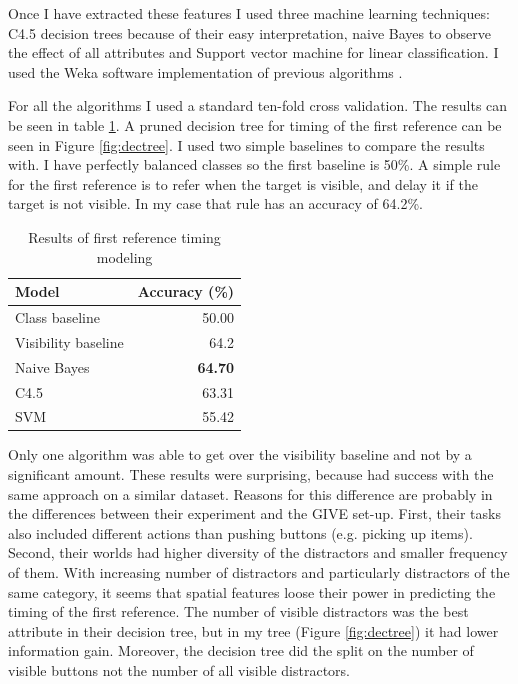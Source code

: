 Once I have extracted these features I used three machine learning techniques: C4.5 decision trees because of their easy interpretation, naive Bayes to observe the effect of all attributes and Support vector machine for linear classification. I used the Weka software implementation of previous algorithms \citep{hall2009weka}.

For all the algorithms I used a standard ten-fold cross validation. The results can be seen in table \ref{tab:firstref}. A pruned decision tree for timing of the first reference can be seen in Figure \ref{fig:dectree}. I used two simple baselines to compare the results with. I have perfectly balanced classes so the first baseline is 50\%. A simple rule for the first reference is to refer when the target is visible, and delay it if the target is not visible. In my case that rule has an accuracy of 64.2\%. 

\begin{table}[!htbp]
 \centering
\begin{tabular}{lr}
\toprule
Model    & Accuracy (\%)  \\
\midrule
Class baseline    & 50.00\\
Visibility baseline & 64.2\\
\midrule
Naive Bayes  & \textbf{64.70} \\
C4.5 & 63.31 \\
SVM & 55.42 \\
\bottomrule
\end{tabular}
\caption{Results of first reference timing modeling}
\label{tab:firstref}
\end{table}

Only one algorithm was able to get over the visibility baseline and not by a significant amount. These results were surprising, because \citet{stoia2006sentence} had success with the same approach on a similar dataset. Reasons for this difference are probably in the differences between their experiment and the GIVE set-up. First, their tasks also included different actions than pushing buttons (e.g. picking up items). Second, their worlds had higher diversity of the distractors and smaller frequency of them. With increasing number of distractors and particularly distractors of the same category, it seems that spatial features loose their power in predicting the timing of the first reference. The number of visible distractors was the best attribute in their decision tree, but in my tree (Figure \ref{fig:dectree}) it had lower information gain. Moreover, the decision tree did the split on the number of visible buttons not the number of all visible distractors.

